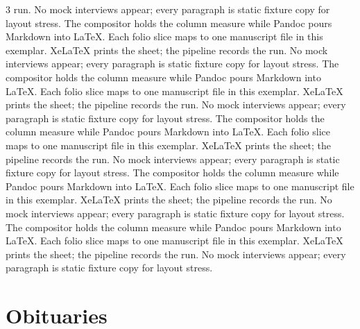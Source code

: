 \documentclass[
]{article}
\begin{document}
\begin{multicols}{3}
run. No mock interviews appear; every paragraph is static fixture copy
for layout stress. The compositor holds the column measure while Pandoc
pours Markdown into LaTeX. Each folio slice maps to one manuscript file
in this exemplar. XeLaTeX prints the sheet; the pipeline records the
run. No mock interviews appear; every paragraph is static fixture copy
for layout stress. The compositor holds the column measure while Pandoc
pours Markdown into LaTeX. Each folio slice maps to one manuscript file
in this exemplar. XeLaTeX prints the sheet; the pipeline records the
run. No mock interviews appear; every paragraph is static fixture copy
for layout stress. The compositor holds the column measure while Pandoc
pours Markdown into LaTeX. Each folio slice maps to one manuscript file
in this exemplar. XeLaTeX prints the sheet; the pipeline records the
run. No mock interviews appear; every paragraph is static fixture copy
for layout stress. The compositor holds the column measure while Pandoc
pours Markdown into LaTeX. Each folio slice maps to one manuscript file
in this exemplar. XeLaTeX prints the sheet; the pipeline records the
run. No mock interviews appear; every paragraph is static fixture copy
for layout stress. The compositor holds the column measure while Pandoc
pours Markdown into LaTeX. Each folio slice maps to one manuscript file
in this exemplar. XeLaTeX prints the sheet; the pipeline records the
run. No mock interviews appear; every paragraph is static fixture copy
for layout stress.

\end{multicols}

\newpage

\section{Obituaries}\label{obituaries}
\end{document}
